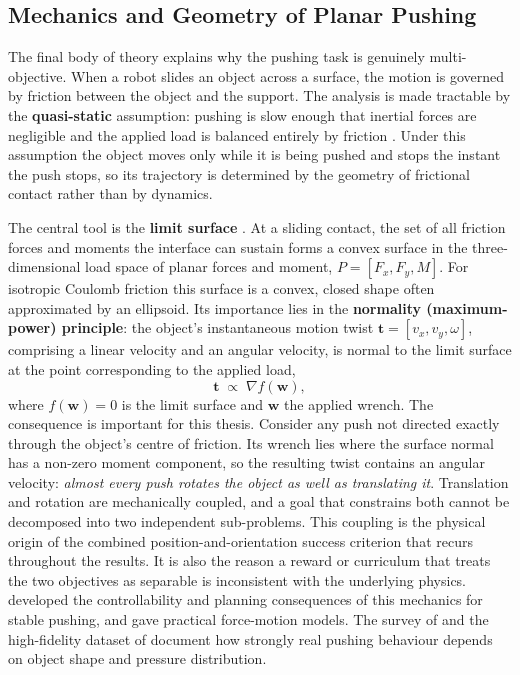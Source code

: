 \subsection{Mechanics and Geometry of Planar Pushing}
\label{sec:pushing}

The final body of theory explains why the pushing task is genuinely
multi-objective. When a robot slides an object across a surface, the motion is
governed by friction between the object and the support. The analysis is made
tractable by the \textbf{quasi-static} assumption: pushing is slow enough that
inertial forces are negligible and the applied load is balanced entirely by
friction \cite{Mason1986Pushing}. Under this assumption the object moves only
while it is being pushed and stops the instant the push stops, so its trajectory
is determined by the geometry of frictional contact rather than by dynamics.

The central tool is the \textbf{limit surface} \cite{Goyal1991}. At a sliding
contact, the set of all friction forces and moments the interface can sustain
forms a convex surface in the three-dimensional load space of planar forces and
moment, $P = [F_x, F_y, M]$. For isotropic Coulomb friction this surface is a
convex, closed shape often approximated by an ellipsoid. Its importance lies in
the \textbf{normality (maximum-power) principle}: the object's instantaneous
motion twist $\mathbf{t} = [v_x, v_y, \omega]$, comprising a linear velocity and
an angular velocity, is normal to the limit surface at the point corresponding to
the applied load,
\begin{equation}
    \mathbf{t} \;\propto\; \nabla f(\mathbf{w}),
    \label{eq:normality}
\end{equation}
where $f(\mathbf{w}) = 0$ is the limit surface and $\mathbf{w}$ the applied wrench.
The consequence is important for this thesis. Consider any push not directed
exactly through the object's centre of friction. Its wrench lies where the surface
normal has a non-zero moment component, so the resulting twist contains an angular
velocity: \emph{almost every push rotates the object as well as translating it}.
Translation and rotation are mechanically coupled, and a goal that constrains both
cannot be decomposed into two independent sub-problems. This coupling is the
physical origin of the combined position-and-orientation success criterion that
recurs throughout the results. It is also the reason a reward or curriculum that
treats the two objectives as separable is inconsistent with the underlying
physics. \cite{LynchMason1996} developed the controllability and planning
consequences of this mechanics for stable pushing, and \cite{HoweCutkosky1996}
gave practical force-motion models. The survey of \cite{Stuber2020PushingSurvey}
and the high-fidelity dataset of \cite{Yu2016MillionWays} document how strongly
real pushing behaviour depends on object shape and pressure distribution.

